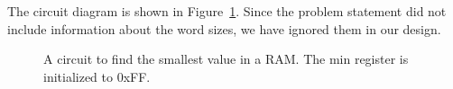 The circuit diagram is  shown in Figure~\ref{fig:sequentialBBmin}.  Since the
problem statement did not include information about the word sizes, we have
ignored them in our design.

\begin{figure}[ht]
\caption{A circuit to find the smallest value in a RAM.  The min
register is initialized to 0xFF.}
\label{fig:sequentialBBmin}
\end{figure}

